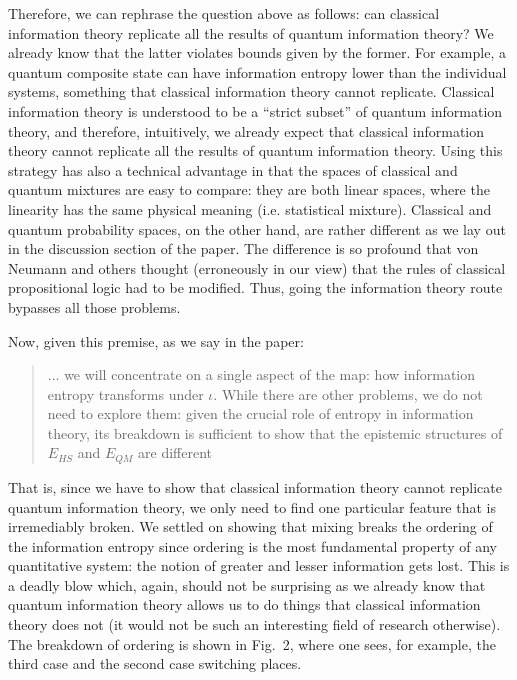 \documentclass[11pt]{article}
\begin{document}
	Therefore, we can rephrase the question above as follows: can classical information theory replicate all the results of quantum information theory? We already know that the latter violates bounds given by the former. For example, a quantum composite state can have information entropy lower than the individual systems, something that classical information theory cannot replicate. Classical information theory is understood to be a ``strict subset'' of quantum information theory, and therefore, intuitively, we already expect that classical information theory cannot replicate all the results of quantum information theory. Using this strategy has also a technical advantage in that the spaces of classical and quantum mixtures are easy to compare: they are both linear spaces, where the linearity has the same physical meaning (i.e. statistical mixture). Classical and quantum probability spaces, on the other hand, are rather different as we lay out in the discussion section of the paper. The difference is so profound that von Neumann and others thought (erroneously in our view) that the rules of classical propositional logic had to be modified. Thus, going the information theory route bypasses all those problems.
	\vspace{2mm}
	
	Now, given this premise, as we say in the paper:
	\begin{quote}
		... we will concentrate on a single aspect of the map: how information entropy transforms under $\iota$. While there are other problems, we do not need to explore them: given the crucial role of entropy in information theory, its breakdown is
		sufficient to show that the epistemic structures of $E_{HS}$
		and $E_{QM}$ are different
	\end{quote}
	That is, since we have to show that classical information theory cannot replicate quantum information theory, we only need to find one particular feature that is irremediably broken. We settled on showing that mixing breaks the ordering of the information entropy since ordering is the most fundamental property of any quantitative system: the notion of greater and lesser information gets lost. This is a deadly blow which, again, should not be surprising as we already know that quantum information theory allows us to do things that classical information theory does not (it would not be such an interesting field of research otherwise). The breakdown of ordering is shown in Fig.~2, where one sees, for example, the third case and the second case switching places.
	
\end{document}
